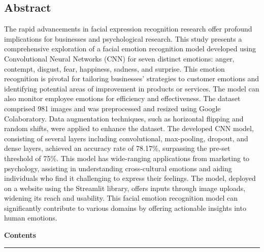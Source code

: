 \documentclass[11pt]{article}
\begin{document}
\begin{center}
    \section*{\LARGE Abstract}
\end{center}
\thispagestyle{empty}
The rapid advancements in facial expression recognition research offer profound implications for businesses and psychological research. This study presents a comprehensive exploration of a facial emotion recognition model developed using Convolutional Neural Networks (CNN) for seven distinct emotions: anger, contempt, disgust, fear, happiness, sadness, and surprise. This emotion recognition is pivotal for tailoring businesses' strategies to customer emotions and identifying potential areas of improvement in products or services. The model can also monitor employee emotions for efficiency and effectiveness. The dataset comprised 981 images and was preprocessed and resized using Google Colaboratory. Data augmentation techniques, such as horizontal flipping and random shifts, were applied to enhance the dataset. The developed CNN model, consisting of several layers including convolutional, max-pooling, dropout, and dense layers, achieved an accuracy rate of 78.17\%, surpassing the pre-set threshold of 75\%. This model has wide-ranging applications from marketing to psychology, assisting in understanding cross-cultural emotions and aiding individuals who find it challenging to express their feelings. The model, deployed on a website using the Streamlit library, offers inputs through image uploads, widening its reach and usability. This facial emotion recognition model can significantly contribute to various domains by offering actionable insights into human emotions.

\pagebreak
\Huge{\textbf{Contents}}
\vspace{.1in}
    \hrule height 0.25mm
\vspace{0.15in}
\tableofcontents
\thispagestyle{empty}
\pagebreak
\clearpage
{}
\end{document}
